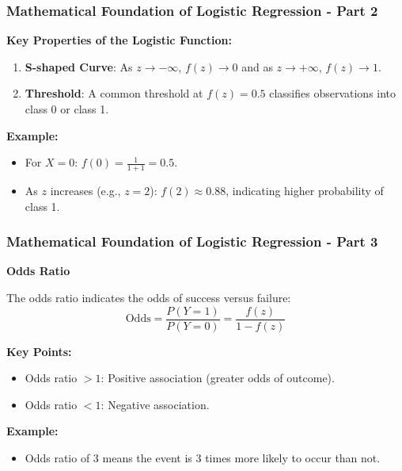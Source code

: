\documentclass[aspectratio=169]{beamer}
\begin{document}
\begin{frame}[fragile]
    \frametitle{Mathematical Foundation of Logistic Regression - Part 2}
    
    \textbf{Key Properties of the Logistic Function:}
    \begin{enumerate}
        \item \textbf{S-shaped Curve}: As \( z \to -\infty \), \( f(z) \to 0 \) and as \( z \to +\infty \), \( f(z) \to 1 \).
        \item \textbf{Threshold}: A common threshold at \( f(z) = 0.5 \) classifies observations into class 0 or class 1.
    \end{enumerate}

    \textbf{Example:}
    \begin{itemize}
        \item For \( X = 0 \): \( f(0) = \frac{1}{1 + 1} = 0.5 \).
        \item As \( z \) increases (e.g., \( z = 2 \)): \( f(2) \approx 0.88 \), indicating higher probability of class 1.
    \end{itemize}
\end{frame}

\begin{frame}[fragile]
    \frametitle{Mathematical Foundation of Logistic Regression - Part 3}
    
    \textbf{Odds Ratio}
    
    The odds ratio indicates the odds of success versus failure:
    \begin{equation}
        \text{Odds} = \frac{P(Y=1)}{P(Y=0)} = \frac{f(z)}{1 - f(z)}
    \end{equation}
    
    \textbf{Key Points:}
    \begin{itemize}
        \item Odds ratio \( > 1 \): Positive association (greater odds of outcome).
        \item Odds ratio \( < 1 \): Negative association.
    \end{itemize}

    \textbf{Example:}
    \begin{itemize}
        \item Odds ratio of 3 means the event is 3 times more likely to occur than not.
    \end{itemize}
\end{frame}
\end{document}

